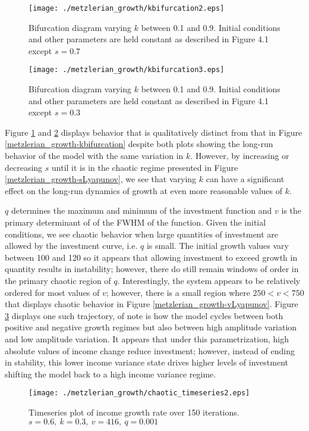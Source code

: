 \begin{figure}
    \centering
    \texttt{[image: ./metzlerian\_growth/kbifurcation2.eps]}
    \caption{Bifurcation diagram varying $k$ between 0.1 and 0.9. Initial conditions and other parameters are held constant as described in Figure 4.1 except $s=0.7$}
    \label{metzlerian_growth-kbifurcation2}
\end{figure}
\begin{figure}
    \centering
    \texttt{[image: ./metzlerian\_growth/kbifurcation3.eps]}
    \caption{Bifurcation diagram varying $k$ between 0.1 and 0.9. Initial conditions and other parameters are held constant as described in Figure 4.1 except $s=0.3$}
    \label{metzlerian_growth-kbifurcation3}
\end{figure}
Figure \ref{metzlerian_growth-kbifurcation2} and \ref{metzlerian_growth-kbifurcation3} displays behavior that is qualitatively distinct from that in Figure \ref{metzlerian_growth-kbifurcation} despite both plots showing the long-run behavior of the model with the same variation in $k$. However, by increasing or decreasing $s$ until it is in the chaotic regime presented in Figure \ref{metzlerian_growth-sLyapunov}, we see that varying $k$ can have a significant effect on the long-run dynamics of growth at even more reasonable values of $k$.

$q$ determines the maximum and minimum of the investment function and $v$ is the primary determinant of of the FWHM of the function. Given the initial conditions, we see chaotic behavior when large quantities of investment are allowed by the investment curve, i.e. $q$ is small. The initial growth values vary between 100 and 120 so it appears that allowing investment to exceed growth in quantity results in instability;  however, there do still remain windows of order in the primary chaotic region of $q$. Interestingly, the system appears to be relatively ordered for most values of $v$; however, there is a small region where $250<v<750$ that displays chaotic behavior in Figure \ref{metzlerian_growth-vLyapunov}. Figure \ref{metzlerian_growth-chaotic_timeseries2} displays one such trajectory, of note is how the model cycles between both positive and negative growth regimes but also between high amplitude variation and low amplitude variation. It appears that under this parametrization, high absolute values of income change reduce investment; however, instead of ending in stability, this lower income variance state drives higher levels of investment shifting the model back to a high income variance regime.
\begin{figure}
    \centering
    \texttt{[image: ./metzlerian\_growth/chaotic\_timeseries2.eps]}
    \caption{Timeseries plot of income growth rate over 150 iterations. $s=0.6,\ k=0.3,\ v=416,\ q=0.001$}
    \label{metzlerian_growth-chaotic_timeseries2}
\end{figure}

